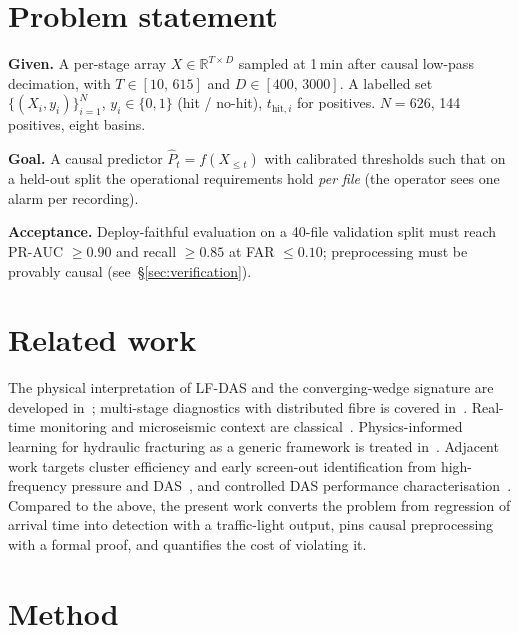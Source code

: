\documentclass{article}
\begin{document}
\section{Problem statement}
\label{sec:problem}

\textbf{Given.} A per-stage array $X \in \mathbb{R}^{T \times D}$
sampled at 1\,min after causal low-pass decimation, with
$T \in [10,\,615]$ and $D \in [400,\,3000]$. A labelled set
$\{(X_i, y_i)\}_{i=1}^{N}$, $y_i \in \{0, 1\}$ (hit / no-hit),
$t_{\text{hit}, i}$ for positives. $N = 626$, 144 positives, eight
basins.

\textbf{Goal.} A causal predictor $\hat P_t = f(X_{\le t})$ with
calibrated thresholds such that on a held-out split the operational
requirements hold \emph{per file} (the operator sees one alarm per
recording).

\textbf{Acceptance.} Deploy-faithful evaluation on a 40-file validation
split must reach PR-AUC $\ge 0.90$ and recall $\ge 0.85$ at
FAR $\le 0.10$; preprocessing must be provably causal
(see~\S\ref{sec:verification}).

\section{Related work}
\label{sec:related}

The physical interpretation of LF-DAS and the converging-wedge
signature are developed in~\cite{liu2020,li2024}; multi-stage
diagnostics with distributed fibre is covered
in~\cite{pakhotina2020,alaamri2024}. Real-time monitoring and
microseismic context are classical~\cite{cipolla2002,lecalvez2007}.
Physics-informed learning for hydraulic fracturing as a generic
framework is treated in~\cite{khan2024piml}. Adjacent work targets
cluster efficiency and early screen-out identification from
high-frequency pressure and DAS~\cite{korkin2020hfpressure,%
korkin2024cluster,alaamri2025oman}, and controlled DAS performance
characterisation~\cite{kuznetsov2025urtec,lecalvez2025integrated,parkhonyuk2018}.
Compared to the above, the present work converts the problem from
regression of arrival time into detection with a traffic-light output,
pins causal preprocessing with a formal proof, and quantifies the cost
of violating it.

\section{Method}
\label{sec:method}
\end{document}

